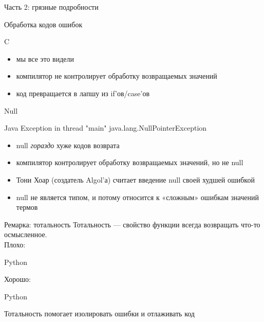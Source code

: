 \documentclass[10pt]{beamer}
\begin{document}
\begin{frame}{}
  \begin{center}
    \huge Часть 2: грязные подробности
  \end{center}
\end{frame}

\begin{frame}{Обработка кодов ошибок}
  \begin{block}{C}
    \centering
    \small
    \lstset{language=c}
    
  \end{block}
  \begin{itemize}
  \item мы все это видели
  \item компилятор не контролирует обработку возвращаемых значений
  \item код превращается в лапшу из if'ов/case'ов
  \end{itemize}
\end{frame}

\begin{frame}{Null}
  \begin{block}{Java}
    Exception in thread "main" java.lang.NullPointerException
  \end{block}
  \begin{itemize}
  \item null \emph{гораздо} хуже кодов возврата
  \item компилятор контролирует обработку возвращаемых значений, но не null
  \item Тони Хоар (создатель Algol'а) считает введение null своей худшей ошибкой
  \item null не является типом, и потому относится к «сложным» ошибкам значений термов
  \end{itemize}
\end{frame}

\begin{frame}{Ремарка: тотальность}
  Тотальность — свойство функции всегда возвращать что-то осмысленное.\\
  Плохо:
  \begin{block}{Python}
    \centering
    \small
    \lstset{language=python}
    
  \end{block}
  Хорошо:
  \begin{block}{Python}
    \centering
    \small
    \lstset{language=python}
    
  \end{block}
  Тотальность помогает изолировать ошибки и отлаживать код
\end{frame}
\end{document}
